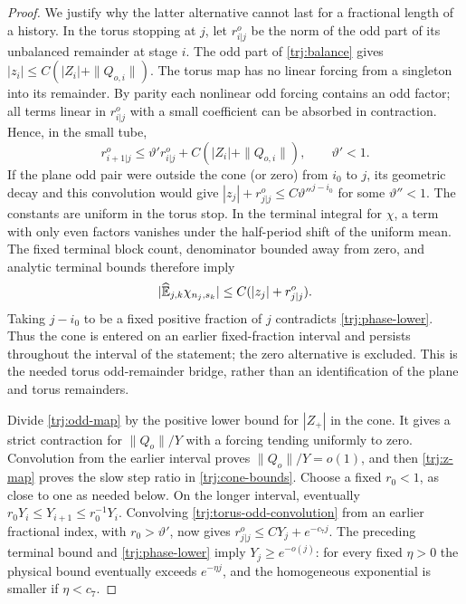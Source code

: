 \begin{proof}
We justify why the latter alternative cannot last for a fractional
length of a history.  In the torus stopping at \(j\), let
\(r^o_{i|j}\) be the norm of the odd part of its unbalanced remainder
at stage \(i\).  The odd part of \eqref{trj:balance} gives
\(|z_i|\le C(|Z_i|+\|Q_{o,i}\|)\).  The torus map has no linear
forcing from a singleton into its remainder.  By parity each nonlinear
odd forcing contains an odd factor; all terms linear in \(r^o_{i|j}\)
with a small coefficient can be absorbed in contraction.  Hence, in
the small tube,
\begin{equation}\label{trj:torus-odd-convolution}
 r^o_{i+1|j}\le\vartheta' r^o_{i|j}
                         +C(|Z_i|+\|Q_{o,i}\|),
                  \qquad \vartheta'<1.
\end{equation}
If the plane odd pair were outside the cone (or zero) from \(i_0\)
to \(j\), its geometric decay and this convolution would give
\(|z_j|+r^o_{j|j}\le C\vartheta''^{j-i_0}\) for some
\(\vartheta''<1\).  The constants are uniform in the torus stop.
In the terminal integral for \(\chi\), a term with only even factors
vanishes under the half-period shift of the uniform mean.  The fixed
terminal block count, denominator bounded away from zero, and analytic
terminal bounds therefore imply
\[
       |\widehat{\mathbb E}_{j,k}\chi_{n_j,s_k}|
                 \le C(|z_j|+r^o_{j|j}).
\]
Taking \(j-i_0\) to be a fixed positive fraction of \(j\) contradicts
\eqref{trj:phase-lower}.  Thus the cone is entered on an earlier
fixed-fraction interval and persists throughout the interval of the
statement; the zero alternative is excluded.  This is the needed
torus odd-remainder bridge, rather than an identification of the
plane and torus remainders.

Divide \eqref{trj:odd-map} by the positive lower bound for
\(|Z_+|\) in the cone.  It gives a strict contraction for
\(\|Q_o\|/Y\) with a forcing tending uniformly to zero.  Convolution
from the earlier interval proves \(\|Q_o\|/Y=o(1)\), and then
\eqref{trj:z-map} proves the slow step ratio in
\eqref{trj:cone-bounds}.  Choose a fixed \(r_0<1\), as close to one
as needed below.  On the longer interval, eventually
\(r_0Y_i\le Y_{i+1}\le r_0^{-1}Y_i\).
Convolving \eqref{trj:torus-odd-convolution} from an earlier fractional
index, with \(r_0>\vartheta'\), now gives
\(r^o_{j|j}\le CY_j+e^{-c_7j}\).  The preceding terminal bound and
\eqref{trj:phase-lower} imply \(Y_j\ge e^{-o(j)}\): for every fixed
\(\eta>0\) the physical bound eventually exceeds \(e^{-\eta j}\),
and the homogeneous exponential is smaller if \(\eta<c_7\).


\end{proof}
